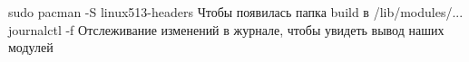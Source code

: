sudo pacman -S linux513-headers
	Чтобы появилась папка build в /lib/modules/...
journalctl -f
	Отслеживание изменений в журнале, чтобы увидеть вывод наших модулей
